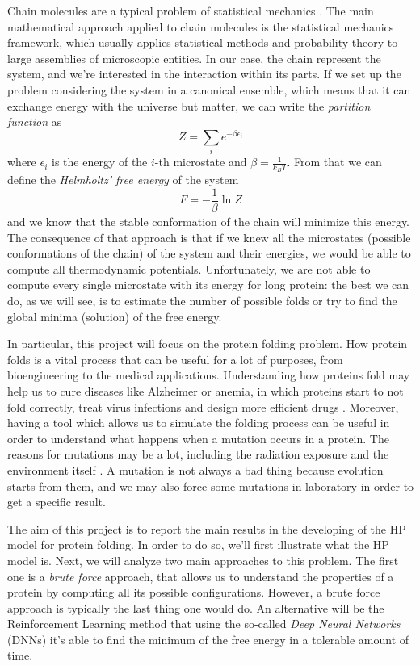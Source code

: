 Chain molecules are a typical problem of statistical mechanics \cite{statisticalmechanics}.
The main mathematical approach applied to chain molecules is the statistical mechanics framework, which usually applies statistical methods and probability theory to large assemblies of microscopic entities.
In our case, the chain represent the system, and we're interested in the interaction within its parts.
If we set up the problem considering the system in a canonical ensemble, which means that it can exchange energy with the universe but matter, we can write the \emph{partition function} as
\begin{equation*}
    Z = \sum_i e^{-\beta\epsilon_i}
\end{equation*}
where $\epsilon_i$ is the energy of the $i$-th microstate and $\beta = \frac{1}{k_BT}$.
From that we can define the \emph{Helmholtz' free energy} of the system
\begin{equation*}
    F = -\frac{1}{\beta} \ln Z
\end{equation*}
and we know that the stable conformation of the chain will minimize this energy.
The consequence of that approach is that if we knew all the microstates (possible conformations of the chain) of the system and their energies, we would be able to compute all thermodynamic potentials.
Unfortunately, we are not able to compute every single microstate with its energy for long protein: the best we can do, as we will see, is to estimate the number of possible folds or try to find the global minima (solution) of the free energy.

In particular, this project will focus on the protein folding problem.
How protein folds is a vital process that can be useful for a lot of purposes, from bioengineering to the medical applications.
Understanding how proteins fold may help us to cure diseases like Alzheimer or anemia, in which proteins start to not fold correctly, treat virus infections and design more efficient drugs \cite{PERM}. 
Moreover, having a tool which allows us to simulate the folding process can be useful in order to understand what happens when a mutation occurs in a protein.
The reasons for mutations may be a lot, including the radiation exposure and the environment itself \cite{zanichelli}.
A mutation is not always a bad thing because evolution starts from them, and we may also force some mutations in laboratory in order to get a specific result.

The aim of this project is to report the main results in the developing of the HP model for protein folding.
In order to do so, we'll first illustrate what the HP model is.
Next, we will analyze two main approaches to this problem.
The first one is a \emph{brute force} approach, that allows us to understand the properties of a protein by computing all its possible configurations.
However, a brute force approach is typically the last thing one would do.
An alternative will be the Reinforcement Learning method that using the so-called \emph{Deep Neural Networks} (DNNs) it's able to find the minimum of the free energy in a tolerable amount of time.